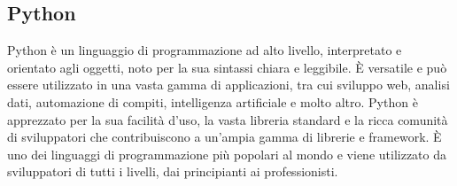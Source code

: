 \vspace{2em}
\subsection*{Python}
Python è un linguaggio di programmazione ad alto livello, interpretato e orientato agli oggetti, noto per la sua sintassi chiara e leggibile. È versatile e può essere utilizzato in una vasta gamma di applicazioni, tra cui sviluppo web, analisi dati, automazione di compiti, intelligenza artificiale e molto altro. Python è apprezzato per la sua facilità d'uso, la vasta libreria standard e la ricca comunità di sviluppatori che contribuiscono a un'ampia gamma di librerie e framework. È uno dei linguaggi di programmazione più popolari al mondo e viene utilizzato da sviluppatori di tutti i livelli, dai principianti ai professionisti.
